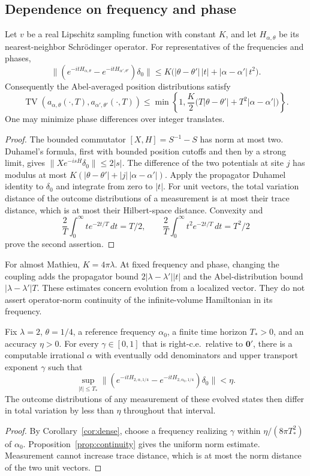\subsection{Dependence on frequency and phase}

\begin{proposition}\label{prop:continuity}
Let $v$ be a real Lipschitz sampling function with constant $K$, and let
$H_{\alpha,\theta}$ be its nearest-neighbor Schr\"odinger operator.
For representatives of the frequencies and phases,
\[
\|(e^{-itH_{\alpha,\theta}}-e^{-itH_{\alpha',\theta'}})\delta_0\|
\le K\bigl(|\theta-\theta'|\,|t|+|\alpha-\alpha'|\,t^2\bigr).
\]
Consequently the Abel-averaged position distributions satisfy
\[
\operatorname{TV}(a_{\alpha,\theta}(\cdot,T),a_{\alpha',\theta'}(\cdot,T))
\le\min\left\{1,\frac K2
\bigl(T|\theta-\theta'|+T^2|\alpha-\alpha'|\bigr)\right\}.
\]
One may minimize phase differences over integer translates.
\end{proposition}
\begin{proof}
The bounded commutator $[X,H]=S^{-1}-S$ has norm at most two.
Duhamel's formula, first with bounded position cutoffs and then by a strong limit, gives
$\|Xe^{-isH}\delta_0\|\le2|s|$.
The difference of the two potentials at site $j$ has modulus at most
$K(|\theta-\theta'|+|j|\,|\alpha-\alpha'|)$.
Apply the propagator Duhamel identity to $\delta_0$ and integrate from zero to $|t|$.
For unit vectors, the total variation distance of the outcome distributions of a measurement is at most their trace distance, which is at most their Hilbert-space distance. Convexity and
\[
\frac2T\int_0^\infty te^{-2t/T}\,dt=T/2,\qquad
\frac2T\int_0^\infty t^2e^{-2t/T}\,dt=T^2/2
\]
prove the second assertion.
\end{proof}

For almost Mathieu, $K=4\pi\lambda$. At fixed frequency and phase, changing the coupling adds the propagator bound $2|\lambda-\lambda'||t|$ and the Abel-distribution bound $|\lambda-\lambda'|T$. These estimates concern evolution from a localized vector. They do not assert operator-norm continuity of the infinite-volume Hamiltonian in its frequency.

\begin{corollary}\label{cor:finitehorizon}
Fix $\lambda=2$, $\theta=1/4$, a reference frequency $\alpha_0$, a finite
time horizon $T_*>0$, and an accuracy $\eta>0$.
For every $\gamma\in[0,1]$ that is right-c.e.\ relative to $\mathbf0'$,
there is a computable irrational $\alpha$ with eventually odd denominators
and upper transport exponent $\gamma$ such that
\[
 \sup_{|t|\le T_*}
 \|(e^{-itH_{2,\alpha,1/4}}-e^{-itH_{2,\alpha_0,1/4}})\delta_0\|<\eta.
\]
The outcome distributions of any measurement of these evolved states
then differ in total variation by less than $\eta$ throughout that interval.
\end{corollary}
\begin{proof}
By Corollary~\ref{cor:dense}, choose a frequency realizing $\gamma$ within
$\eta/(8\pi T_*^2)$ of $\alpha_0$.
Proposition~\ref{prop:continuity} gives the uniform norm estimate.
Measurement cannot increase trace distance, which is at most the norm
distance of the two unit vectors.
\end{proof}

